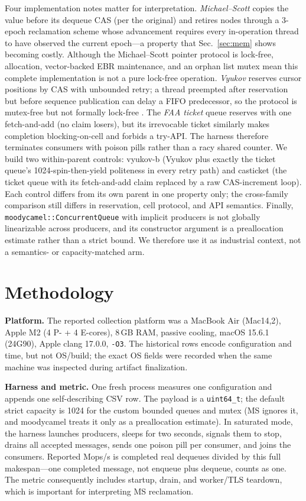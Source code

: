 \documentclass[conference]{IEEEtran}
\begin{document}
Four implementation notes matter for interpretation. \emph{Michael--Scott}
copies the value before its dequeue CAS (per the original) and retires nodes
through a 3-epoch reclamation scheme whose advancement requires every
in-operation thread to have observed the current epoch---a property that
Sec.~\ref{sec:mem} shows becoming costly. Although the Michael--Scott pointer
protocol is lock-free, allocation, vector-backed EBR maintenance, and an orphan
list mutex mean this complete implementation is not a pure lock-free operation.
\emph{Vyukov} reserves cursor positions by CAS with unbounded retry; a thread
preempted after reservation but before sequence publication can delay a FIFO
predecessor, so the protocol is mutex-free but not formally lock-free
\cite{vyukov}. The \emph{FAA ticket} queue reserves with one fetch-and-add (no
claim losers), but its irrevocable ticket similarly makes completion
blocking-on-cell and forbids a try-API. The harness therefore terminates
consumers with poison pills rather than a racy shared counter. We build two
within-parent controls:
\textsf{vyukov-b} (Vyukov plus exactly the ticket queue's 1024-spin-then-yield
politeness in every retry path) and \textsf{casticket} (the ticket queue with
its fetch-and-add claim replaced by a raw CAS-increment loop). Each control
differs from its own parent in one property only; the cross-family comparison
still differs in reservation, cell protocol, and API semantics. Finally,
\texttt{moodycamel::ConcurrentQueue} with implicit producers is not globally
linearizable across producers, and its constructor argument is a preallocation
estimate rather than a strict bound. We therefore use it as industrial context,
not a semantics- or capacity-matched arm.

\section{Methodology}
\label{sec:method}
\textbf{Platform.} The reported collection platform was a MacBook Air
(Mac14,2), Apple M2 (4 P- + 4 E-cores), 8\,GB RAM, passive cooling, macOS
15.6.1 (24G90), Apple clang 17.0.0, \texttt{-O3}. The historical rows encode
configuration and time, but not OS/build; the exact OS fields were recorded
when the same machine was inspected during artifact finalization.

\textbf{Harness and metric.} One fresh process measures one configuration and
appends one self-describing CSV row. The payload is a \texttt{uint64\_t}; the
default strict capacity is 1024 for the custom bounded queues and mutex (MS
ignores it, and moodycamel treats it only as a preallocation estimate). In
saturated mode, the harness launches producers, sleeps for two seconds, signals
them to stop, drains all accepted messages, sends one poison pill per consumer,
and joins the consumers. Reported Mops/s is completed real dequeues divided by this full
makespan---one completed message, not enqueue plus dequeue, counts as one. The
metric consequently includes startup, drain, and worker/TLS teardown, which is
important for interpreting MS reclamation.
\end{document}
